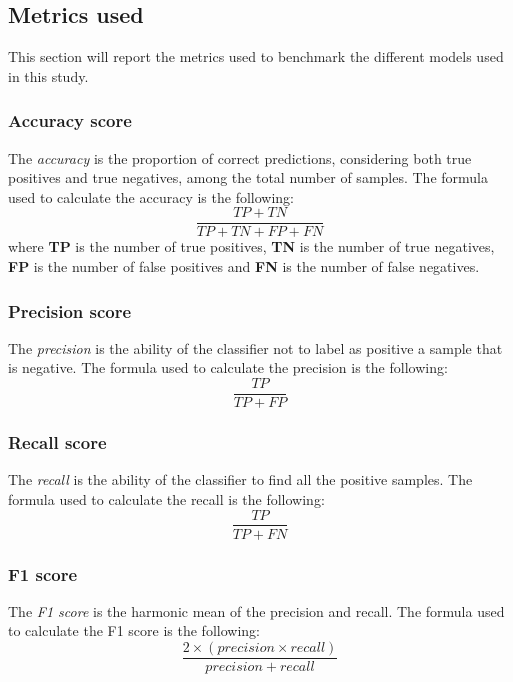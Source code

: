         \subsection{Metrics used}
            This section will report the metrics used to benchmark the different models used in this study.

            \subsubsection{Accuracy score}
                The \textit{accuracy} is the proportion of correct predictions, considering both true positives and true negatives, among the total number of samples. The formula used to calculate the accuracy is the following:
                \begin{equation}
                    \frac{TP + TN}{TP + TN + FP + FN}
                \end{equation} 
                where \textbf{TP} is the number of true positives, \textbf{TN} is the number of true negatives, \textbf{FP} is the number of false positives and \textbf{FN} is the number of false negatives.
            \subsubsection{Precision score}
                The \textit{precision} is the ability of the classifier not to label as positive a sample that is negative. The formula used to calculate the precision is the following:
                \begin{equation}
                    \frac{TP}{TP + FP}
                \end{equation}
            \subsubsection{Recall score}
                The \textit{recall} is the ability of the classifier to find all the positive samples. The formula used to calculate the recall is the following:
                \begin{equation}
                    \frac{TP}{TP + FN}
                \end{equation}
            \subsubsection{F1 score}
                The \textit{F1 score} is the harmonic mean of the precision and recall. The formula used to calculate the F1 score is the following:
                \begin{equation}
                    \frac{ 2 \times (precision \times recall)}{precision + recall}
                \end{equation}

